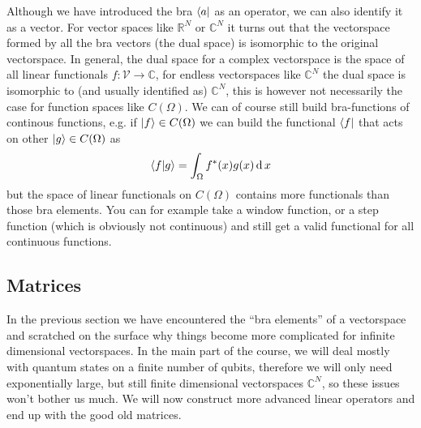 Although we have introduced the bra $\bra{a}$ as an operator, we can also identify it as a vector. For vector spaces like $\mathbb{R}^N$ or $\mathbb{C}^N$ it turns out that the vectorspace formed by all the bra vectors (the dual space) is isomorphic to the original vectorspace.
In general, the dual space for a complex vectorspace is the space of all linear functionals $f: \mathcal{V} \rightarrow \mathbb{C}$, for endless vectorspaces like $\mathbb{C}^N$ the dual space is isomorphic to (and usually identified as) $\mathbb{C}^N$, this is however not necessarily the case for function spaces like $C(\Omega)$.
We can of course still build bra-functions of continous functions, e.g. if $\ket{f}\in C(\Omega)$ we can build the functional $\bra{f}$ that acts on other $\ket{g}\in C(\Omega)$ as
\begin{align*}
    \braket{f}{g} = \int_\Omega f^*(x) g(x) \operatorname{d}x
\end{align*}
but the space of linear functionals on $C(\Omega)$ contains more functionals than those bra elements.
You can for example take a window function, or a step function (which is obviously not continuous) and still get a valid functional for all continuous functions. 
\subsection{Matrices}
In the previous section we have encountered the ``bra elements'' of a vectorspace and scratched on the surface why things become more complicated for infinite dimensional vectorspaces. 
In the main part of the course, we will deal mostly with quantum states on a finite number of qubits, therefore we will only need exponentially large, but still finite dimensional vectorspaces $\mathbb{C}^N$, so these issues won't bother us much. 
We will now construct more advanced linear operators and end up with the good old matrices.

